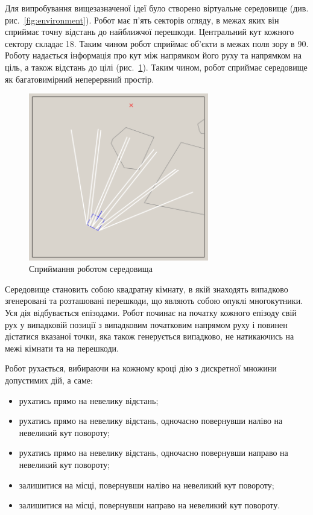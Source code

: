 Для випробування вищезазначеної ідеї було створено віртуальне середовище (див. рис.~\ref{fig:environment}). Робот має п'ять секторів огляду, в межах яких він сприймає точну відстань до найближчої перешкоди. Центральний кут кожного сектору складає 18\textdegree. Таким чином робот сприймає об'єкти в межах поля зору в 90\textdegree. Роботу надається інформація про кут між напрямком його руху та напрямком на ціль, а також відстань до цілі (рис.~\ref{fig:perception}). Таким чином, робот сприймає середовище як багатовимірний неперервний простір.

\begin{figure}
	\centering
    \includegraphics[width=0.7\textwidth]{perception.png}
	\caption{Сприймання роботом середовища}
	\label{fig:perception}
\end{figure}

Середовище становить собою квадратну кімнату, в якій знаходять випадково згенеровані та розташовані перешкоди, що являють собою опуклі многокутники. Уся дія відбувається епізодами. Робот починає на початку кожного епізоду свій рух у випадковій позиції з випадковим початковим напрямом руху і повинен дістатися вказаної точки, яка також генерується випадково, не натикаючись на межі кімнати та на перешкоди.

Робот рухається, вибираючи на кожному кроці дію з дискретної множини допустимих дій, а саме:
\begin{itemize}
	\item рухатись прямо на невелику відстань;
	\item рухатись прямо на невелику відстань, одночасно повернувши наліво на невеликий кут повороту;
	\item рухатись прямо на невелику відстань, одночасно повернувши направо на невеликий кут повороту;
	\item залишитися на місці, повернувши наліво на невеликий кут повороту;
	\item залишитися на місці, повернувши направо на невеликий кут повороту.
\end{itemize}

